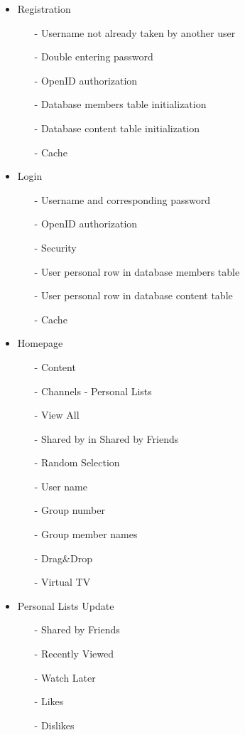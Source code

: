 \documentclass{acm_proc_article-sp}
\begin{document}
\begin{itemize}
  \item Registration 
  \begin{itemize}
  	\item [-]Username not already taken by another user
  	\item [-]Double entering password
  	\item [-]OpenID authorization
  	\item [-]Database members table initialization
  	\item [-]Database content table initialization
  	\item [-]Cache
  \end{itemize}
  \item Login
  \begin{itemize}
  	\item [-]Username and corresponding password
  	\item [-]OpenID authorization
  	\item [-]Security
  	\item [-]User personal row in database members table
  	\item [-]User personal row in database content table
  	\item [-]Cache
  \end{itemize}
  \item Homepage 
  \begin{itemize}
  	\item [-]Content
  	\item [-]Channels - Personal Lists
  	\item [-]View All
  	\item [-]Shared by in Shared by Friends
  	\item [-]Random Selection
  	\item [-]User name
  	\item [-]Group number
  	\item [-]Group member names
  	\item [-]Drag\&Drop
  	\item [-]Virtual TV
  \end{itemize}
  \item Personal Lists Update
  \begin{itemize}
  	\item [-]Shared by Friends
  	\item [-]Recently Viewed
  	\item [-]Watch Later
  	\item [-]Likes
  	\item [-]Dislikes

\end{itemize}
\end{itemize}
\end{document}
